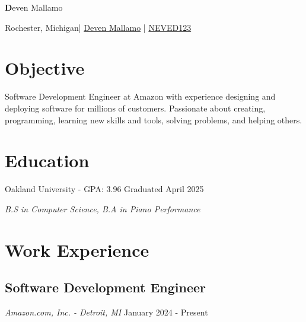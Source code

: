 \documentclass{article}
\newcommand{\resumesection}[1]{
	\section*{\Large\textbf{#1}}
	\hrulefill
	\vspace{1ex}
}
\newcommand{\name}{Deven Mallamo}
\newcommand{\address}{Rochester, \hspace{49152sp}Michigan}
\newcommand{\linkedin}{Deven Mallamo}
\newcommand{\github}{NEVED123}
\begin{document}
\begin{tcolorbox}[colback= boxfill,colframe=boxframe]
	\begin{center}
		\vspace{5pt}
		\Huge \textbf \name

		\normalsize \vspace{10pt}

		\faHome \space \address \space | 
		\href{https://www.linkedin.com/in/deven-mallamo/}{\space \faLinkedin \space \linkedin} \space | 
		\href{https://github.com/NEVED123}{\space \faGithub \space \github} 
	\end{center}
\end{tcolorbox}

\vspace{1ex}

\resumesection{Objective}

\vspace{.2ex}	

Software Development Engineer at Amazon with experience designing and deploying software for millions of customers. Passionate about creating, programming, learning new skills and tools, solving problems, and helping others.

\vspace{.5ex}	


\resumesection{Education}

\vspace{.2ex}	

Oakland University - GPA: 3.96 \hfill Graduated April 2025

\textit {B.S in Computer Science, B.\hspace{49152sp}A in Piano Performance} 

\vspace{.5ex}


\resumesection{Work Experience}

\subsection*{Software Development Engineer} 

\textit{Amazon.com, Inc. - Detroit, MI} \hfill {January 2024 - Present}
\end{document}
